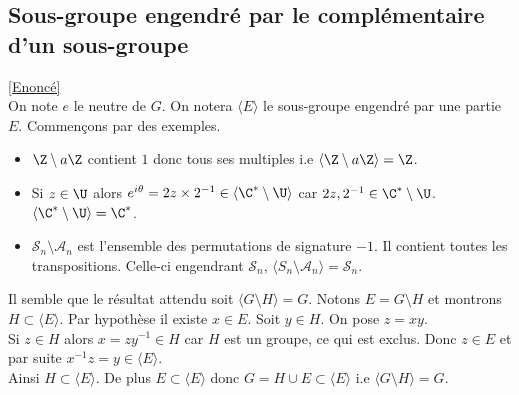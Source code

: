 \documentclass[8pt]{book}
\begin{document}
	\subsection{Sous-groupe engendré par le complémentaire d'un sous-groupe }
	\label{Sous-groupe engendré par le complémentaire d'un sous-groupe corrigé}
	\textcolor{blue}{\hyperref[Sous-groupe engendré par le complémentaire d'un sous-groupe]{[Enoncé]}}\\
	On note $e$ le neutre de $G$. On notera $\langle E\rangle$ le sous-groupe engendré par une partie $E$.
	Commençons par des exemples.
	\begin{itemize}
		\item $\Z\setminus a\Z$ contient $1$ donc tous ses multiples i.e $\langle\Z\setminus a\Z\rangle=\Z$.
		\item Si $z\in \U$ alors $e^{i\theta}=2z\times 2^{-1}\in \langle\C^*\setminus\U\rangle$ car $2z,2^{-1}\in \C^*\setminus\U$. $\langle\C^*\setminus\U\rangle=\C^*$.
		\item $\mathcal S_n\setminus\mathcal A_n$ est l'ensemble des permutations de signature $-1$. Il contient toutes les transpositions. Celle-ci engendrant $\mathcal S_n$, $\langle S_n\setminus\mathcal A_n\rangle=\mathcal S_n$.
	\end{itemize}
	Il semble que le résultat attendu soit $\langle G\setminus H\rangle=G$. Notons $E=G\setminus H$ et montrons $H\subset \langle E\rangle$. Par hypothèse il existe $x\in E$. Soit $y\in H$. On pose $z=xy$.\\
	Si $z\in H$ alors $x=zy^{-1}\in H$ car $H$ est un groupe, ce qui est exclus. Donc $z\in E$ et par suite $x^{-1}z=y\in\langle E\rangle$.\\
	Ainsi $H\subset \langle E\rangle$. De plus $E\subset \langle E\rangle$ donc $G=H\cup E\subset \langle E\rangle$ i.e $\langle G\setminus H\rangle=G$.
	
\end{document}
